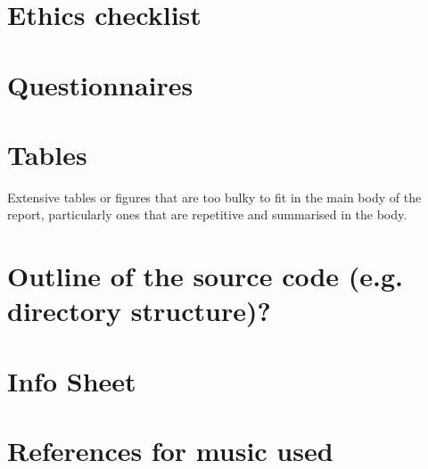 \documentclass{l4proj}
\begin{document}
\begin{appendices}

\chapter{Ethics checklist}

\chapter{Questionnaires}

\chapter{Tables}
Extensive tables or figures that are too bulky to fit in the main body of the report, particularly ones that are repetitive and summarised in the body.

\chapter{Outline of the source code (e.g. directory structure)?}

\chapter{Info Sheet}

\chapter{References for music used}

\end{appendices}





\end{document}
